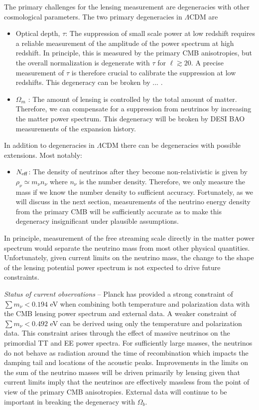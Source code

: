 The primary challenges for the lensing measurement are degeneracies with other cosmological parameters.  The two primary degeneracies in $\Lambda$CDM are
\begin{itemize}
\item Optical depth, $\tau$: The suppression of small scale power at low redshift requires a reliable measurement of the amplitude of the power spectrum at high redshift.  In principle, this is measured by the primary CMB anisotropies, but the overall normalization is degenerate with $\tau$ for $\ell \gtrsim 20$.  A precise measurement of $\tau$ is therefore crucial to calibrate the suppression at low redshifts.  This degeneracy can be broken by ... .
\item $\Omega_m$ : The amount of lensing is controlled by the total amount of matter.  Therefore, we can compensate for a suppression from neutrinos by increasing the matter power spectrum.  This degeneracy will be broken by DESI BAO measurements of the expansion history.
\end{itemize}
In addition to degeneracies in $\Lambda$CDM there can be degeneracies with possible extensions.  Most notably:
\begin{itemize}
\item $N_{\rm eff}$: The density of neutrinos after they become non-relativistic is given by $\rho_\nu \simeq m_\nu n_\nu$ where $n_\nu$ is the number density.  Therefore, we only measure the mass if we know the number density to sufficient accuracy.  Fortunately, as we will discuss in the next section, measurements of the neutrino energy density from the primary CMB will be sufficiently accurate as to make this degeneracy insignificant under plausible assumptions.
\end{itemize}
In principle, measurement of the free streaming scale directly in the matter power spectrum would separate the neutrino mass from most other physical quantities.  Unfortunately, given current limits on the neutrino mass, the change to the shape of the lensing potential power spectrum is not expected to drive future constraints.  

{\it Status of current observations} -- Planck has provided a strong constraint of $\sum m_\nu < 0.194$ eV when combining both temperature and polarization data with the CMB lensing power spectrum and external data.  A weaker constraint of $\sum m_\nu < 0.492$ eV can be derived using only the temperature and polarization data.  This constraint arises through the effect of massive neutrinos on the primordial TT and EE power spectra.  For sufficiently large masses, the neutrinos do not behave as radiation around the time of recombination which impacts the damping tail and locations of the acoustic peaks.  Improvements in the limits on the sum of the neutrino masses will be driven primarily by lensing given that current limits imply that the neutrinos are effectively massless from the point of view of the primary CMB anisotropies.  External data will continue to be important in breaking the degeneracy with $\Omega_b$.  

